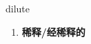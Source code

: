 
\begin{frame}
{\huge dilute}
\begin{center}
\begin{enumerate}\Large
  \item \textbf{稀释/经稀释的}
\end{enumerate}
\end{center}
\end{frame}
